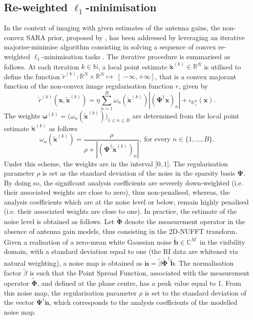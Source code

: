 \documentclass[fleqn,usenatbib]{mnras}
\newcommand{\bb}{\ensuremath{\boldsymbol{b}}}
\newcommand{\xb}{\ensuremath{\boldsymbol{x}}}
\newcommand{\nb}{\ensuremath{\boldsymbol{n}}}
\newcommand{\Psib}{\ensuremath{\boldsymbol{\Psi}}}
\newcommand{\Phib}{\ensuremath{\boldsymbol{\Phi}}}
\newcommand{\eC}{\mathbb{C}}
\newcommand{\eN}{\mathbb{N}}
\newcommand{\eR}{\mathbb{R}}
\begin{document}
\subsection{Re-weighted $\ell_1$-minimisation}\label{ssec:rw_algo}
{In the context of imaging with given estimates of the antenna gains, the non-convex SARA prior, proposed by \citet{Carrillo2012}, has been addressed by leveraging an iterative majorise-minimise algorithm consisting in solving a sequence of convex re-weighted $\ell_1$-minimisation tasks \citep{Candes2008}. The iterative procedure is summarised as follows. At each iteration $k\in \eN$, a local point estimate $\tilde{\xb}^{(k)}\in \eR^N$ is utilised to define the function $\tilde{r}^{(k)}:\eR^{N}\times \eR^{N}\mapsto \left]-\infty,+\infty\right]$, that is a convex majorant function of the non-convex image regularisation function $r$, given by
\begin{equation}
\label{eq:model-prior}
 \tilde{r}^{(k)}(\xb,\tilde{\xb}^{(k)}) = \eta \sum_{n=1}^B {\omega_n(\tilde{\xb}^{(k)})} \left | \left(\Psib^\dagger \xb \right)_n\right| + \iota_{\eR^{N}_{+}}(\xb).
\end{equation} 
The weights $\boldsymbol{\omega}^{(k)}=\big({\omega_n(\tilde{\xb}^{(k)})} \big)_{1 \leq n \leq B}$ are determined from the local point estimate $\tilde{\xb}^{(k)}$ as follows
\begin{equation}
{\omega_n(\tilde{\xb}^{(k)})} = \frac{{{\rho}}}{\rho+ \left | \left(\Psib^\dagger \tilde{\xb}^{(k)} \right)_n\right| },~\textrm{for every~} n \in \{1,\dots,B\}.
\label{eq:rw}
\end{equation}
{{Under this scheme, the weights are in the interval $]0,1]$. The regularisation parameter $\rho$ is set as the standard deviation of the noise in the sparsity basis $\Psib$. By doing so, the significant analysis coefficients are severely down-weighted (i.e. their associated weights are close to zero), thus non-penalised, whereas, the analysis coefficients which are at the noise level or below, remain highly penalised (i.e. their associated weights are close to one). In practice, the estimate of the noise level is obtained as follows. Let $\tilde{\Phib}$ denote the measurement operator in the absence of antenna gain models, thus consisting in the 2D-NUFFT transform. Given a realisation of a zero-mean white Gaussian noise $\tilde{\bb} \in \eC^{M^{\prime}}$ in the visibility domain, with a standard deviation equal to one (the RI data are whitened via natural weighting), a noise map is obtained as $\tilde{\nb}=\tilde{\beta}\tilde{\Phib}^\dagger \tilde{\bb} $. The normalisation factor $\tilde{\beta}$ is such that the Point Spread Function, associated with the measurement operator $\tilde{\Phib}$, and defined at the phase centre, has a peak value equal to 1. From this noise map, the regularisation parameter ${\rho}$ is set to the standard deviation of the vector $\Psib ^{\dagger}\tilde{\nb}$, which corresponds to the analysis coefficients of the modelled noise map.}}

}
\end{document}
